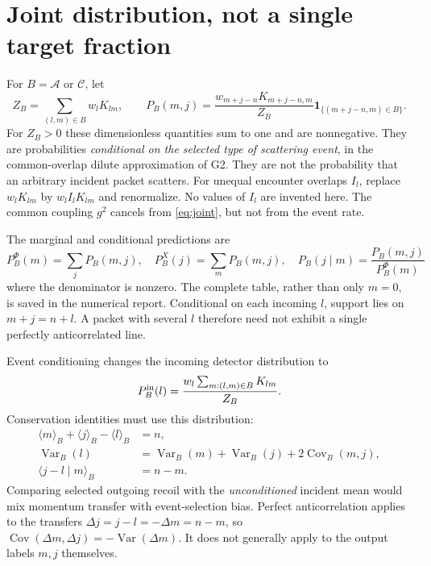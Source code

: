 \documentclass[11pt,a4paper]{article}
\newcommand{\cA}{\mathcal A}
\newcommand{\cC}{\mathcal C}
\begin{document}
\section{Joint distribution, not a single target fraction}
For $B=\cA$ or $\cC$, let
\begin{equation}
 Z_B=\sum_{(l,m)\in B}w_lK_{lm},\qquad
 \boxed{P_B(m,j)=
 \frac{w_{m+j-n}K_{m+j-n,m}}{Z_B}
 \mathbf 1_{\{(m+j-n,m)\in B\}}}.
 \label{eq:joint}
\end{equation}
For $Z_B>0$ these dimensionless quantities sum to one and are nonnegative.
They are probabilities \emph{conditional on the selected type of
scattering event}, in the common-overlap dilute approximation of G2.
They are not the probability that an arbitrary incident packet scatters.
For unequal encounter overlaps $I_l$, replace $w_lK_{lm}$ by
$w_lI_lK_{lm}$ and renormalize. No values of $I_l$ are invented here.
The common coupling $g^2$ cancels from \eqref{eq:joint}, but not
from the event rate.

The marginal and conditional predictions are
\begin{equation}
 P_B^\Phi(m)=\sum_jP_B(m,j),\quad
 P_B^X(j)=\sum_mP_B(m,j),\quad
 P_B(j\mid m)=\frac{P_B(m,j)}{P_B^\Phi(m)}
\end{equation}
where the denominator is nonzero. The complete table, rather than
only $m=0$, is saved in the numerical report. Conditional on each
incoming $l$, support lies on $m+j=n+l$. A packet with several $l$
therefore need not exhibit a single perfectly anticorrelated line.

Event conditioning changes the incoming detector distribution to
\begin{equation}
 P_B^{\rm in}(l)=\frac{w_l\sum_{m:(l,m)\in B}K_{lm}}{Z_B}.
\end{equation}
Conservation identities must use this distribution:
\begin{align}
 \langle m\rangle_B+\langle j\rangle_B-\langle l\rangle_B&=n,\\
 \operatorname{Var}_B(l)
 &=\operatorname{Var}_B(m)+\operatorname{Var}_B(j)
        +2\operatorname{Cov}_B(m,j),\\
 \langle j-l\mid m\rangle_B&=n-m .
\end{align}
Comparing selected outgoing recoil with the \emph{unconditioned}
incident mean would mix momentum transfer with event-selection bias.
Perfect anticorrelation applies to the transfers
$\Delta j=j-l=-\Delta m=n-m$, so
$\operatorname{Cov}(\Delta m,\Delta j)=-\operatorname{Var}(\Delta m)$.
It does not generally apply to the output labels $m,j$ themselves.
\end{document}
